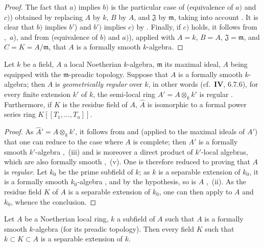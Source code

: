 \begin{proof}
The fact that $a)$ implies $b)$ is the particular case of  (equivalence of $a)$ and $c)$) obtained by replacing $A$ by $k$, $B$ by $A$, and $\mathfrak{J}$ by $\mathfrak{m}$, taking into account .
It is clear that $b)$ implies $b'$) and $b')$ implies $c)$ by .
Finally, if $c)$ holds, it follows from ,~$a$), and from  (equivalence of $b)$ and $a)$), applied with $A=k$, $B=A$, $\mathfrak{J}=\mathfrak{m}$, and $C=K=A/\mathfrak{m}$, that $A$ is a formally smooth $k$-algebra.
\end{proof}

\begin{corollary}[19.6.5]
\label{0.19.6.5}
Let $k$ be a field, $A$ a local Noetherian $k$-algebra, $\mathfrak{m}$ its maximal ideal, $A$ being equipped with the $\mathfrak{m}$-preadic topology.
Suppose that $A$ is a formally smooth $k$-algebra;
then $A$ is \emph{geometrically regular} over $k$, in other words (cf.~$\mathbf{IV}$, 6.7.6), for every finite extension $k'$ of $k$, the semi-local ring $A'=A\otimes_k k'$ is regular .
Furthermore, if $K$ is the residue field of $A$, $\widehat{A}$ is isomorphic to a formal power series ring $K[[T_1,\ldots,T_n]]$.
\end{corollary}

\begin{proof}
As $\widehat{A}'=\widehat{A}\otimes_k k'$, it follows from  and  (applied to the maximal ideals of $A'$) that one can reduce to the case where $A$ is complete;
then $A'$ is a formally smooth $k'$-algebra ,~(iii) and is moreover a direct product of $k'$-local algebras, which are also formally smooth ,~(v).
One is therefore reduced to proving that $A$ is \emph{regular}.
Let $k_0$ be the prime subfield of $k$;
as $k$ is a separable extension of $k_0$, it is a formally smooth $k_0$-algebra , and by the hypothesis, so is $A$ ,~(ii).
As the residue field $K$ of $A$ is a separable extension of $k_0$, one can then apply  to $A$ and $k_0$, whence the conclusion.
\end{proof}


\begin{corollary}[19.6.5.1]
\label{0.19.6.5.1}
Let $A$ be a Noetherian local ring, $k$ a subfield of $A$ such that $A$ is a formally smooth $k$-algebra (for its preadic topology).
Then every field $K$ such that $k\subset K\subset A$ is a separable extension of $k$.
\end{corollary}

